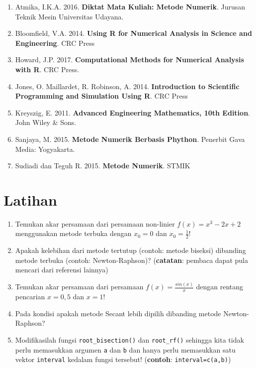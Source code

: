 \documentclass[]{book}
\providecommand{\tightlist}{%
  \setlength{\itemsep}{0pt}\setlength{\parskip}{0pt}}
\theoremstyle{definition}
\theoremstyle{definition}
\theoremstyle{definition}
\theoremstyle{remark}
\begin{document}
\begin{enumerate}
\def\labelenumi{\arabic{enumi}.}
\tightlist
\item
  Atmika, I.K.A. 2016. \textbf{Diktat Mata Kuliah: Metode Numerik}. Jurusan Teknik Mesin Universitas Udayana.
\item
  Bloomfield, V.A. 2014. \textbf{Using R for Numerical Analysis in Science and Engineering}. CRC Press
\item
  Howard, J.P. 2017. \textbf{Computational Methods for Numerical Analysis with R}. CRC Press.
\item
  Jones, O. Maillardet, R. Robinson, A. 2014. \textbf{Introduction to Scientific Programming and Simulation Using R}. CRC Press
\item
  Kreyszig, E. 2011. \textbf{Advanced Engineering Mathematics, 10th Edition}. John Wiley \& Sons.
\item
  Sanjaya, M. 2015. \textbf{Metode Numerik Berbasis Phython}. Penerbit Gava Media: Yogyakarta.
\item
  Sudiadi dan Teguh R. 2015. \textbf{Metode Numerik}. STMIK
\end{enumerate}

\hypertarget{latihan-1}{%
\section{Latihan}\label{latihan-1}}

\begin{enumerate}
\def\labelenumi{\arabic{enumi}.}
\tightlist
\item
  Temukan akar persamaan dari persamaan non-linier \(f\left(x\right)=x^3-2x+2\) menggunakan metode terbuka dengan \(x_0=0\) dan \(x_0=\frac{1}{2}\)!
\item
  Apakah kelebihan dari metode tertutup (contoh: metode biseksi) dibanding metode terbuka (contoh: Newton-Raphson)? (\textbf{catatan}: pembaca dapat pula mencari dari referensi lainnya)
\item
  Temukan akar persamaan dari persamaan \(f\left(x\right)=\frac{sin\left(x\right)}{x}\) dengan rentang pencarian \(x=0,5\) dan \(x=1\)!
\item
  Pada kondisi apakah metode Secant lebih dipilih dibanding metode Newton-Raphson?
\item
  Modifikasilah fungsi \texttt{root\_bisection()} dan \texttt{root\_rf()} sehingga kita tidak perlu memasukkan argumen \texttt{a} dan \texttt{b} dan hanya perlu memasukkan satu vektor \texttt{interval} kedalam fungsi tersebut! (\textbf{contoh}: \texttt{interval=c(a,b)})
\end{enumerate}
\end{document}
